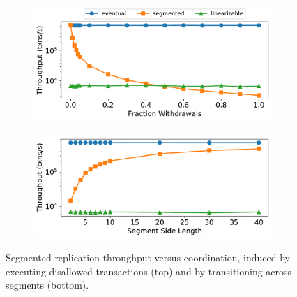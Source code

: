 \begin{figure}[ht]
  \centering

  \begin{subfigure}[c]{\columnwidth}
    \centering
    \includegraphics[width=\columnwidth]{figures/vary_withdraws.pdf}
  \end{subfigure}
  \begin{subfigure}[c]{\columnwidth}
    \includegraphics[width=\columnwidth]{figures/vary_segments.pdf}
  \end{subfigure}

  \caption{%
    Segmented \invariantconfluent{} replication throughput versus coordination,
    induced by executing disallowed transactions (top) and by transitioning
    across segments (bottom).
  }
\end{figure}

